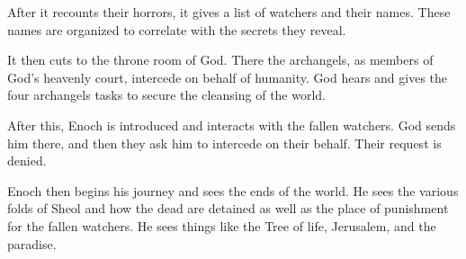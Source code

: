 \documentclass{beamer}
\begin{document}
\begin{frame}
  After it recounts their horrors, it gives a list of watchers and their names.
  These names are organized to correlate with the secrets they reveal.
\end{frame}

\begin{frame}
  It then cuts to the throne room of God.
  There the archangels, as members of God's heavenly court, intercede on behalf of humanity.
  God hears and gives the four archangels tasks to secure the cleansing of the world.
\end{frame}

\begin{frame}
  After this, Enoch is introduced and interacts with the fallen watchers.
  God sends him there, and then they ask him to intercede on their behalf.
  Their request is denied.
\end{frame}

\begin{frame}
  Enoch then begins his journey and sees the ends of the world.
  He sees the various folds of Sheol and how the dead are detained as well as the place of punishment for the fallen watchers.
  He sees things like the Tree of life, Jerusalem, and the paradise.
\end{frame}
\end{document}
